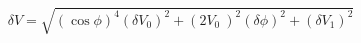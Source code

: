 \begin{equation}
\label{eq:delta_V_Malus}
\delta V = \sqrt{ \left(\cos{\phi}\right)^4(\delta V_0)^2 + \left(2V_0 \ \right)^2(\delta \phi)^2+ (\delta V_1)^2}
\end{equation}